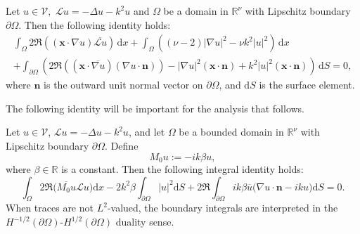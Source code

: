\documentclass[twoside,11pt]{article}
\def\dimx{\nu }
\def\d{{\mathrm d}}
\def\L{{\mathscr{L}}}
\newcommand{\qp}[1]{\ensuremath{\!\left({#1}\right)}}
\newcommand{\norm}[1]{\ensuremath{\left|#1\right|}}
\renewcommand{\vec}[1]{\boldsymbol{#1}}
\def\Vc{{\mathscr V}}
\def\L{{\mathscr{L}}}
\begin{document}
{\begin{proposition}
  \label{cor:intmorawetz}
  {  Let $u\in \Vc,$ $\L u = -\Delta u - k^2 u$   and $\Omega$ be a   domain in $\mathbb{R}^\dimx $ 
  with Lipschitz boundary $\partial \Omega$.} Then the following  identity holds:
%
  \begin{multline}    \label{eq:IntRellich}
    \int_\Omega 2 \Re\qp{\qp{\vec{x} \cdot \nabla u} \overline{\L  u}} \,  \d x
    +
    \int_\Omega \qp{(\dimx  -2) \norm{\nabla u}^2 - \dimx k^2 \norm{u}^2} \,  \d x \\
    +
    \int_{\partial \Omega} \qp{
      2 \Re\qp{\qp{\vec{x} \cdot \overline{\nabla u}} \qp{\nabla u \cdot \vec{n}}}
      -
      \norm{\nabla u}^2 \qp{\vec{x} \cdot \vec{n}}
      +
      k^2 \norm{u}^2 \qp{\vec{x} \cdot \vec{n}}
    } \,  \d S =0,
  \end{multline}
  where $\vec{n}$ is the outward unit normal vector on $\partial
  \Omega$, and $ \d S$ is the surface element.
\end{proposition}

The following identity will be important for the analysis that follows.

\begin{proposition}
  \label{the:boundarymorawetz}
  Let $u\in \Vc$, $\L u = -\Delta u - k^2 u$, and let $\Omega$ be {a bounded} domain in $\mathbb{R}^\dimx$ 
  with Lipschitz boundary $\partial \Omega$. 
  Define
  \begin{equation}  \label{eq:multM0}
    M_0 u :=  - i k \beta  u,
  \end{equation}
  where $\beta \in \mathbb{R}$ is a constant. Then the following integral identity holds:
 \begin{equation} \label {M0}
    \int_\Omega  2  \Re  \big( \overline{M_0 u}  \L  u\big)    \d x
     -    2 k ^2 \beta  \int_{\partial \Omega}   |u|^2    \d S       
     +  2  \Re   \int_{\partial \Omega} i k \beta   \overline{u}   \Big ( \nabla u \cdot \vec{n}
          -ik   u \Big )    \d S  =  0.
  \end{equation}
  {When traces are not $L^2$-valued, the boundary integrals are interpreted in the $H^{-1/2}(\partial\Omega)$-$H^{1/2}(\partial\Omega)$ duality sense.}
\end{proposition}

}
\end{document}

